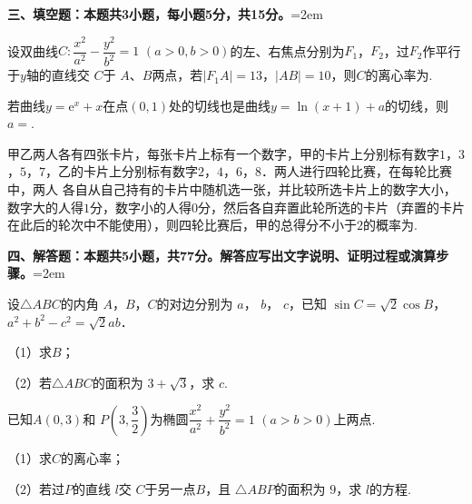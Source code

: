 \documentclass[a4paper, 11pt]{article}
\newcommand{\e}{\mathrm{e}}
\begin{document}
\vspace{10pt}
\noindent \textbf{三、填空题：本题共3小题，每小题5分，共15分。}\hangindent=2em

\begin{question}
	设双曲线$C:\dfrac{x^2}{a^2}-\dfrac{y^2}{b^2}=1$ $(a>0,b>0)$的左、右焦点分别为$F_1$，$F_2$，过$F_2$作平行于$y$轴的直线交 $C$于 $A$、$B$两点，若$\left|F_1A\right|=13$，$\left|AB\right|=10$，则$C$的离心率为\fillin[width=5em][答案].
\end{question}

\begin{question}
	若曲线$y=\e^x+x$在点$(0,1)$处的切线也是曲线$y=\ln(x+1)+a$的切线，则$a=$\fillin[width=5em][答案].
\end{question}

\begin{question}
	甲乙两人各有四张卡片，每张卡片上标有一个数字，甲的卡片上分别标有数字$1$，$3$，$5$，$7$，乙的卡片上分别标有数字$2$，$4$，$6$，$8$．两人进行四轮比赛，在每轮比赛中，两人
各自从自己持有的卡片中随机选一张，并比较所选卡片上的数字大小，数字大的人得$1$分，数字小的人得$0$分，然后各自弃置此轮所选的卡片（弃置的卡片在此后的轮次中不能使用），则四轮比赛后，甲的总得分不小于$2$的概率为\fillin[width=5em][答案]. 
\end{question}


\noindent \textbf{四、解答题：本题共5小题，共77分。解答应写出文字说明、证明过程或演算步骤。}\hangindent=2em

\begin{problem}[points=13]
	设$\triangle ABC$的内角 $A$，$B$，$C$的对边分别为 $a$， $b$， $c$，已知 $\sin C=\sqrt 2\cos B$， $a^2+b^2-c^2=\sqrt 2 ab$．
	
	（1）求$B$；
	
	（2）若$\triangle ABC$的面积为 $3+\sqrt 3$，求 $c$. 
\end{problem}\vspace{80pt}


\begin{problem}[points=15]
	已知$A(0,3)$和 $P\left(3,\dfrac{3}{2}\right)$为椭圆$\dfrac{x^2}{a^2}+\dfrac{y^2}{b^2}=1$ $(a>b>0)$上两点. 
	
	（1）求$C$的离心率；
	
	（2）若过$P$的直线 $l$交 $C$于另一点$B$，且 $\triangle ABP$的面积为 $9$，求 $l$的方程. 
\end{problem}\vspace{80pt}
\end{document}
